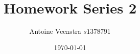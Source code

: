 \documentclass[a4paper]{article}
\author{Antoine Veenstra \(s1378791\)}
\title{Homework Series 2}
\date{\today}
\begin{document}
\maketitle

\section{}


\section{}


\section{}


\section{}


\section{}

\end{document}
